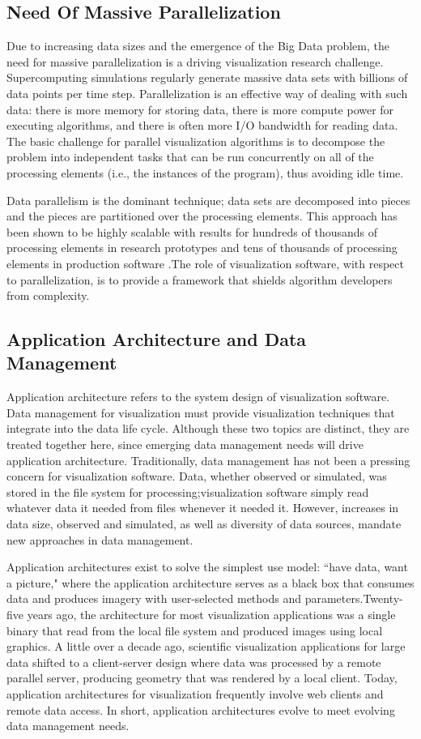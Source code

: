 \subsection{Need Of Massive Parallelization}
Due to increasing data sizes and the emergence of the Big Data problem, the need for massive parallelization is a driving visualization research challenge. Supercomputing simulations regularly generate massive data sets with billions of data points per time step. Parallelization is an effective way of dealing with such data: there is more memory for storing data, there is more compute power for executing algorithms, and there is often more I/O bandwidth for reading data. The basic challenge for parallel visualization algorithms is to decompose the problem into independent tasks that can be run concurrently on all of the processing elements (i.e., the instances of the program), thus avoiding idle time.
\par 
Data parallelism is the dominant technique; data sets are decomposed into pieces and the pieces are partitioned over the processing elements. This approach has been shown to be highly scalable with results for hundreds of thousands of processing elements in research prototypes and tens of thousands of processing elements in production software .The role of visualization software, with respect to parallelization, is to provide a framework that shields algorithm developers from complexity.
\subsection{Application Architecture and Data Management}
Application architecture refers to the system design of visualization software. Data management for visualization must provide visualization techniques that integrate into the data life cycle. Although these two topics are distinct, they are treated together here, since emerging data management needs will drive application architecture. Traditionally, data management has not been a pressing concern for visualization software. Data, whether observed or simulated, was stored in the file system for processing;visualization software simply read whatever data it needed from files whenever it needed it. However, increases in data size, observed and simulated, as well as diversity of data sources, mandate new approaches in data management. 
\par
Application architectures exist to solve the simplest use model: “have data, want a picture," where the application architecture serves as a black box that consumes data and produces imagery with user-selected methods and parameters.Twenty-five years ago, the architecture for most visualization applications was a single binary that read from the local file system and produced images using local graphics. A little over a decade ago, scientific visualization applications for large data shifted to a client-server design where data was processed by a remote parallel server, producing geometry that was rendered by a local client. Today, application architectures for visualization frequently involve web clients and remote data access. In short, application architectures evolve to meet evolving data management needs.
